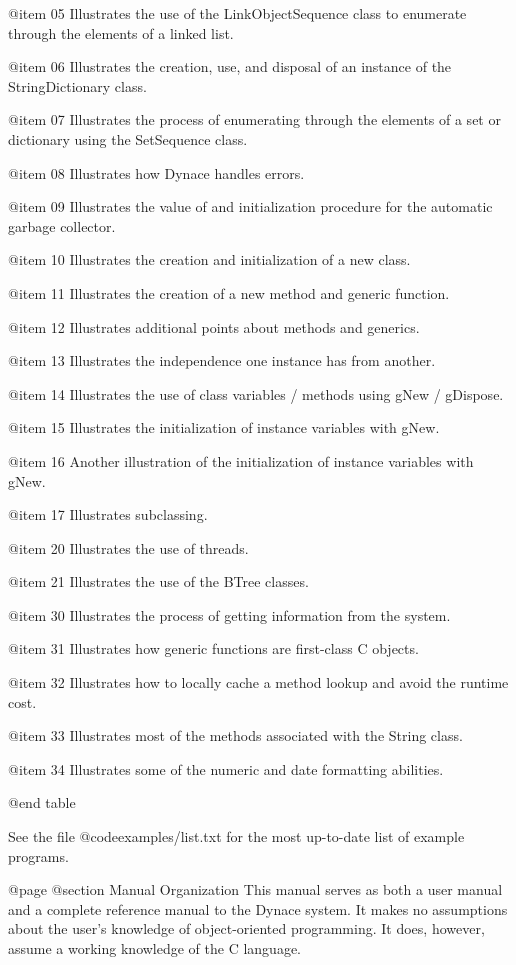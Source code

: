 @item 05
Illustrates the use of the LinkObjectSequence class to enumerate through
the elements of a linked list.

@item 06
Illustrates the creation, use, and disposal of an instance of the
StringDictionary class.

@item 07
Illustrates the process of enumerating through the elements of a
set or dictionary using the SetSequence class.

@item 08
Illustrates how Dynace handles errors.

@item 09
Illustrates the value of and initialization procedure for the automatic
garbage collector.

@item 10
Illustrates the creation and initialization of a new class.

@item 11
Illustrates the creation of a new method and generic function.

@item 12
Illustrates additional points about methods and generics.

@item 13
Illustrates the independence one instance has from another.

@item 14
Illustrates the use of class variables / methods using gNew / gDispose.

@item 15
Illustrates the initialization of instance variables with gNew.

@item 16
Another illustration of the initialization of instance variables with gNew.

@item 17
Illustrates subclassing.

@item 20
Illustrates the use of threads.

@item 21
Illustrates the use of the BTree classes.

@item 30
Illustrates the process of getting information from the system.

@item 31
Illustrates how generic functions are first-class C objects.

@item 32
Illustrates how to locally cache a method lookup and avoid the
runtime cost.

@item 33
Illustrates most of the methods associated with the String class.

@item 34
Illustrates some of the numeric and date formatting abilities.

@end table


See the file @code{examples/list.txt} for the most up-to-date list
of example programs.


@page
@section Manual Organization
This manual serves as both a user manual and a complete reference manual
to the Dynace system.  It makes no assumptions about the user's knowledge
of object-oriented programming.  It does, however, assume a working
knowledge of the C language.

